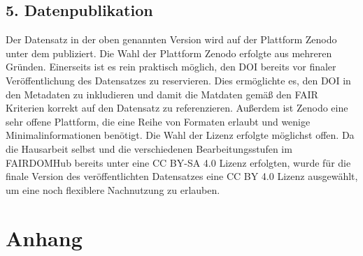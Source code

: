 \documentclass[12pt,a4paper,toc=bibliographynumbered,toc=indenttextentries]{scrreprt}
\begin{document}
		\section*{5. Datenpublikation}
		Der Datensatz in der oben genannten Version wird auf der Plattform Zenodo unter dem  publiziert. Die Wahl der Plattform Zenodo erfolgte aus mehreren Gründen. Einerseits ist es rein praktisch möglich, den DOI bereits vor finaler Veröffentlichung des Datensatzes zu reservieren. Dies ermöglichte es, den DOI in den Metadaten zu inkludieren und damit die Matdaten gemäß den FAIR Kriterien korrekt auf den Datensatz zu referenzieren. Außerdem ist Zenodo eine sehr offene Plattform, die eine Reihe von Formaten erlaubt und wenige Minimalinformationen benötigt.
		Die Wahl der Lizenz erfolgte möglichst offen. Da die Hausarbeit selbst und die verschiedenen Bearbeitungsstufen im FAIRDOMHub bereits unter eine CC BY-SA 4.0 Lizenz erfolgten, wurde für die finale Version des veröffentlichten Datensatzes eine CC BY 4.0 Lizenz ausgewählt, um eine noch flexiblere Nachnutzung zu erlauben.
	
	\clearpage
	\singlespacing
	
	\clearpage
				
	\chapter{Anhang}
\end{document}
